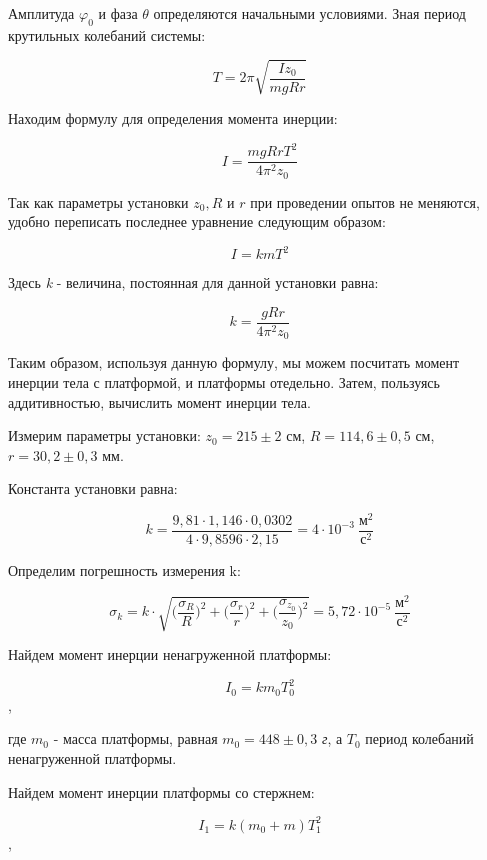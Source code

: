 \documentclass[12pt,a4paper]{article}
\begin{document}
Амплитуда $\varphi_0$ и фаза $\theta$ определяются начальными условиями. Зная период крутильных колебаний системы:

\begin{equation}\label{6}
T = 2\pi \sqrt{\frac{Iz_0}{mgRr}}
\end{equation}

Находим формулу для определения момента инерции:

\begin{equation}\label{7}
I = \frac{mgRrT^2}{4\pi^2z_0}
\end{equation}

Так как параметры установки $z_0, R$ и $r$ при проведении опытов не меняются, удобно переписать последнее уравнение следующим образом:

\begin{equation}\label{8}
I = kmT^2
\end{equation} 

Здесь \textit{k} - величина, постоянная для данной установки равна:

\[k = \frac{gRr}{4\pi^2 z_0}\]

Таким образом, используя данную формулу, мы можем посчитать момент инерции тела с платформой, и платформы отедельно. Затем, пользуясь аддитивностью, вычислить момент инерции тела.

\vspace{0.5cm}

Измерим параметры установки: $z_0 = 215\pm 2$ см, $R = 114,6 \pm 0,5$ см, $r = 30,2 \pm 0,3$ мм.

Константа установки равна:

\[k = \frac{9,81 \cdot 1,146 \cdot 0,0302}{4 \cdot 9,8596 \cdot 2,15}= 4 \cdot 10^{-3} \: \frac{\textit{м}^2}{\textit{с}^2}\]

Определим погрешность измерения k:

\[\sigma_k = k \cdot \sqrt{\Big(\frac{\sigma_R}{R}\Big)^2 + \Big(\frac{\sigma_r}{r}\Big)^2 + \Big(\frac{\sigma_{z_0}}{z_0}\Big)^2} = 5,72 \cdot
 10^{-5} \: \frac{\textit{м}^2}{\textit{с}^2}\]
 
Найдем момент инерции ненагруженной платформы:

\[I_0 = k m_0 T_0^2\],

где $m_0$ - масса платформы, равная $m_0 = 448 \pm 0,3$ \textit{г}, а $T_0$ период колебаний ненагруженной платформы.

Найдем момент инерции платформы со стержнем:

\[I_1 = k (m_0 + m) T_1^2\],
\end{document}
